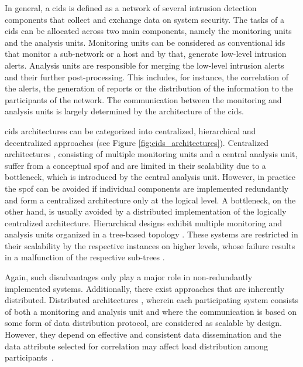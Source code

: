  In general, a \gls{cids} is defined as a network of several intrusion detection components that collect and exchange data on system security. The tasks of a \gls{cids} can be allocated across two main components, namely the monitoring units and the analysis units. Monitoring units can be considered as conventional \gls{ids} that monitor a sub-network or a host and by that, generate low-level intrusion alerts. Analysis units are responsible for merging the low-level intrusion alerts and their further post-processing. This includes, for instance, the correlation of the alerts, the generation of reports or the distribution of the information to the participants of the network. The communication between the monitoring and analysis units is largely determined by the architecture of the \gls{cids}.

 \gls{cids} architectures can be categorized into centralized, hierarchical and decentralized approaches \cite{Zhou2010} (see Figure \ref{fig:cids_architectures}). Centralized architectures \cite{Cuppens2002}\cite{Miller2003}, consisting of multiple monitoring units and a central analysis unit, suffer from a conceptual \gls{spof} and are limited in their scalability due to a bottleneck, which is introduced by the central analysis unit. However, in practice the \gls{spof} can be avoided if individual components are implemented redundantly and form a centralized architecture only at the logical level. A bottleneck, on the other hand, is usually avoided by a distributed implementation of the logically centralized architecture. Hierarchical designs exhibit multiple monitoring and analysis units organized in a tree-based topology \cite{Phillip1997} \cite{Zhang2001} \cite{Nguyen2019}. These systems are restricted in their scalability by the respective instances on higher levels, whose failure results in a malfunction of the respective sub-trees \cite{Zhou2010}. 
 
 Again, such disadvantages only play a major role in non-redundantly implemented systems. Additionally, there exist approaches that are inherently distributed. Distributed architectures \cite{Janakiraman2003} \cite{Fung2008} \cite{Vasilomanolakis2015SkipMon}, wherein each participating system consists of both a monitoring and analysis unit and where the communication is based on some form of data distribution protocol, are considered as scalable by design. However, they depend on effective and consistent data dissemination and the data attribute selected for correlation may affect load distribution among participants~\cite{Zhou2010}. 

